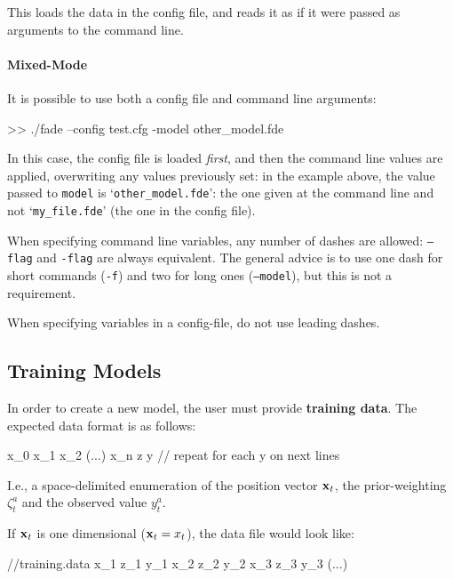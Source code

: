 		This loads the data in the config file, and reads it as if it were passed as arguments to the command line.


		\paragraph{Mixed-Mode} It is possible to use both a config file and command line arguments:

		\begin{terminal}
		>> ./fade --config test.cfg -model other_model.fde
		\end{terminal}

		In this case, the config file is loaded \textit{first}, and then the command line values are applied, overwriting any values previously set: in the example above, the value passed to \texttt{model} is `\texttt{other\_model.fde}': the one given at the command line and not `\texttt{my\_file.fde}' (the one in the config file).


		\begin{aside}
			When specifying command line variables, any number of dashes are allowed: \texttt{--flag} and \texttt{-flag} are always equivalent. The general advice is to use one dash for short commands (\texttt{-f}) and two for long ones (\texttt{--model}), but this is not a requirement.

			When specifying variables in a config-file, do not use leading dashes.
		\end{aside}
\subsection{Training Models}

	In order to create a new model, the user must provide \textbf{training data}. The expected data format is as follows:

	\begin{terminal}
x_0 x_1 x_2 (...) x_n z y
// repeat for each y on next lines
	\end{terminal}
	I.e., a space-delimited enumeration of the position vector $\mathbf{\boldsymbol{\mathrm{x}}}_t$, the prior-weighting $\zeta_t^a$ and the observed value $y_t^a$.

	If $\mathbf{\boldsymbol{\mathrm{x}}}_t$ is one dimensional ($\mathbf{\boldsymbol{\mathrm{x}}}_t = x_t$), the data file would look like:

	\begin{terminal}
//training.data
x_1 z_1 y_1
x_2 z_2 y_2
x_3 z_3 y_3
(...)
\end{terminal}

